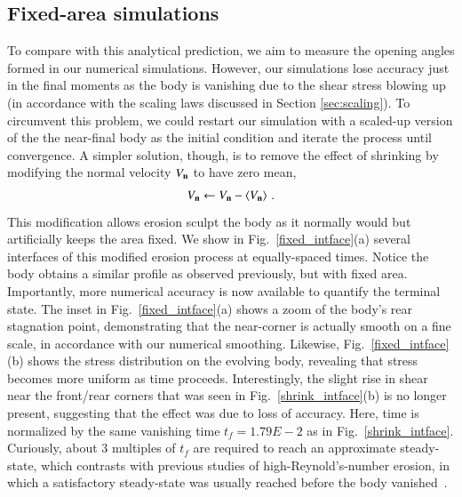 \documentclass[preprint, 10pt]{elsarticle}
\begin{document}
\subsection{Fixed-area simulations}

To compare with this analytical prediction, we aim to measure the opening angles formed in our numerical simulations. However, our simulations lose accuracy just in the final moments as the body is vanishing due to the shear stress blowing up (in accordance with the scaling laws discussed in Section \ref{sec:scaling}). To circumvent this problem, we could restart our simulation with a scaled-up version of the the near-final  body as the initial condition and iterate the process until convergence. A simpler solution, though, is to remove the effect of shrinking by modifying the normal velocity $V_{\mathbf{n}}$ to have zero mean,
\begin{align*}
V_{\mathbf{n}} \leftarrow V_{\mathbf{n}} - \left< V_{\mathbf{n}} \right> \, .
\end{align*}
This modification allows erosion sculpt the body as it normally would but artificially keeps the area fixed. We show in Fig.~\ref{fixed_intface}(a) several interfaces of this modified erosion process at equally-spaced times. Notice the body obtains a similar profile as observed previously, but with fixed area. Importantly, more numerical accuracy is now available to quantify the terminal state. The inset in Fig.~\ref{fixed_intface}(a) shows a zoom of the body's rear stagnation point, demonstrating that the near-corner is actually smooth on a fine scale, in accordance with our numerical smoothing. 
Likewise, Fig.~\ref{fixed_intface}(b) shows the stress distribution on the evolving body, revealing that stress becomes more uniform as time proceeds. Interestingly, the slight rise in shear near the front/rear corners that was seen in Fig.~\ref{shrink_intface}(b) is no longer present, suggesting that the effect was due to loss of accuracy.
Here, time is normalized by the same vanishing time $t_f = 1.79E-2$ as in Fig.~\ref{shrink_intface}. Curiously, about 3 multiples of $t_f$ are required to reach an approximate steady-state, which contrasts with previous studies of high-Reynold's-number erosion, in which a satisfactory steady-state was usually reached before the body vanished~\cite{moo-ris-chi-zha-she2013}.
\end{document}
